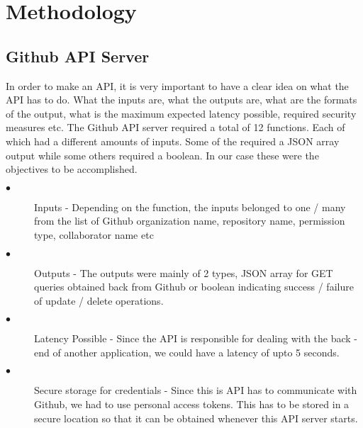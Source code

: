 
\chapter{Methodology} %

\label{ChapterX} %



\section{Github API Server}

In order to make an API, it is very important to have a clear idea on what the API has to do. What the inputs are, what the outputs are, what are the formats of the output, what is the maximum expected latency possible, required security measures etc. The Github API server required a total of 12 functions. Each of which had a different amounts of inputs. Some of the required a JSON array output while some others required a boolean. In our case these were the objectives to be accomplished.
\begin{description}
\item[$\bullet$] Inputs - Depending on the function, the inputs belonged to one / many from the list of Github organization name, repository name, permission type, collaborator name etc
\item[$\bullet$] Outputs - The outputs were mainly of 2 types, JSON array for GET queries obtained back from Github or boolean indicating success / failure of update / delete operations.
\item[$\bullet$] Latency Possible - Since the API is responsible for dealing with the back - end of another application, we could have a latency of upto 5 seconds.
\item[$\bullet$] Secure storage for credentials - Since this is API has to communicate with Github, we had to use personal access tokens. This has to be stored in a secure location so that it can be obtained whenever this API server starts.
\end{description}

